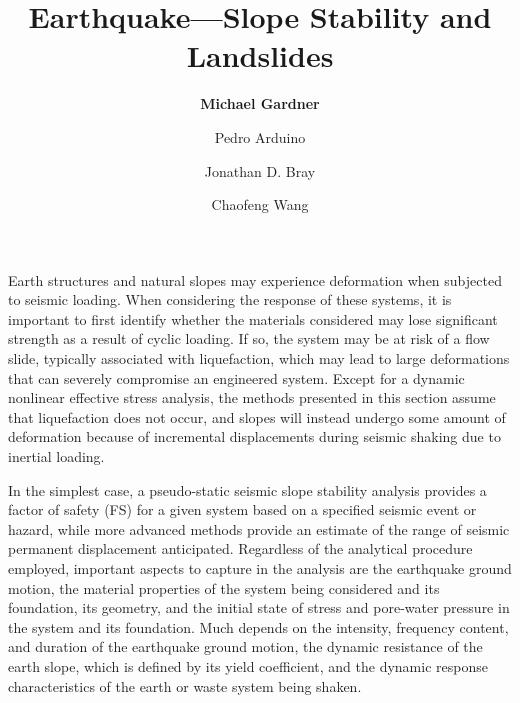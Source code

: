 %
%
%


\title{Earthquake---Slope Stability and Landslides}
\author{
    \textbf{Michael Gardner} 
    \and Pedro Arduino
    \and Jonathan D. Bray
    \and Chaofeng Wang}
\tocauthor{}
%
%
\maketitle

Earth structures and natural slopes may experience deformation when subjected to seismic loading. When considering the response of these systems, it is important to first identify whether the materials considered may lose significant strength as a result of cyclic loading. If so, the system may be at risk of a flow slide, typically associated with liquefaction, which may lead to large deformations that can severely compromise an engineered system. Except for a dynamic nonlinear effective stress analysis, the methods presented in this section assume that liquefaction does not occur, and slopes will instead undergo some amount of deformation because of incremental displacements during seismic shaking due to inertial loading.

In the simplest case, a pseudo-static seismic slope stability analysis provides a factor of safety (FS) for a given system based on a specified seismic event or hazard, while more advanced methods provide an estimate of the range of seismic permanent displacement anticipated. Regardless of the analytical procedure employed, important aspects to capture in the analysis are the earthquake ground motion, the material properties of the system being considered and its foundation, its geometry, and the initial state of stress and pore-water pressure in the system and its foundation. Much depends on the intensity, frequency content, and duration of the earthquake ground motion, the dynamic resistance of the earth slope, which is defined by its yield coefficient, and the dynamic response characteristics of the earth or waste system being shaken.

